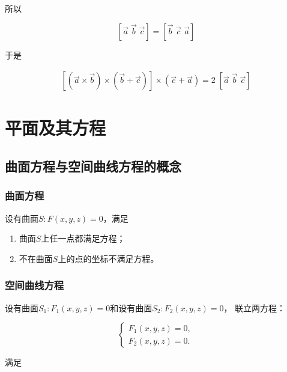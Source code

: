 \documentclass[12pt, a4paper]{article}
\numberwithin{equation}{section}
\begin{document}
    所以

    \[
    \left[\overrightarrow{a} \; \overrightarrow{b} \; \overrightarrow{c}\right] = \left[\overrightarrow{b} \; \overrightarrow{c} \; \overrightarrow{a}\right]
    \]

    于是

    \[
        \begin{split}
            \left[(\overrightarrow{a} \times \overrightarrow{b}) \times (\overrightarrow{b} + \overrightarrow{c})\right] \times (\overrightarrow{c} + \overrightarrow{a})
            = 2 \; \left[\overrightarrow{a} \; \overrightarrow{b} \; \overrightarrow{c}\right]
        \end{split}
    \]

\section{平面及其方程}

\subsection{曲面方程与空间曲线方程的概念}

\subsubsection{曲面方程}

    设有曲面\(S: F\left(x, y, z\right) = 0\)，满足

    \begin{enumerate}
        \item 曲面\(S\)上任一点都满足方程；
        \item 不在曲面\(S\)上的点的坐标不满足方程。
    \end{enumerate}

\subsubsection{空间曲线方程}

    设有曲面\(S_1: F_1\left(x, y, z\right) = 0\)和设有曲面\(S_2: F_2\left(x, y, z\right) = 0\)，
    联立两方程：

    \[
        \begin{cases}
            F_1\left(x, y, z\right) = 0, \\
            F_2\left(x, y, z\right) = 0.
        \end{cases}
    \]

    满足
\end{document}

